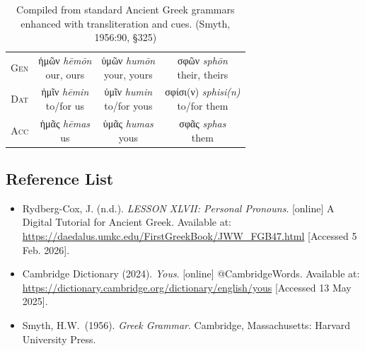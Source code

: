 \documentclass[10pt,a4paper,notitlepage]{article}
\newcommand{\tsc}[1]{\textsc{#1}}
\newcommand*{\grc}[1]{\fontspec{Inter}#1\rmfamily}
\newcommand{\trc}[1]{\textit{\fontspec{Tinos}#1}}
\begin{document}
\begin{table}[H]
\begin{tabular}{c|ccc}
             \tsc{Gen} & \makecell{\grc{ἡμῶν} \trc{hēmōn} \\ \small our, ours} & \makecell{\grc{ὑμῶν} \trc{humōn} \\ \small your, yours}  & \makecell{\grc{σφῶν} \trc{sphōn} \\ \small their, theirs} \\
             \tsc{Dat} & \makecell{\grc{ἡμῖν} \trc{hēmin} \\ \small to/for us} & \makecell{\grc{ὑμῖν} \trc{humin} \\ \small to/for yous}  & \makecell{\grc{σφίσι(ν)} \trc{sphisi(n)} \\ \small to/for them} \\
             \tsc{Acc} & \makecell{\grc{ἡμᾶς} \trc{hēmas} \\ \small us} & \makecell{\grc{ὑμᾶς} \trc{humas} \\ \small yous}  & \makecell{\grc{σφᾶς} \trc{sphas} \\ \small them} \\
         \end{tabular}
         \caption{Compiled from standard Ancient Greek grammars enhanced with transliteration and cues. (Smyth, 1956:90, \S325)}
     \end{table}

    \subsection*{Reference List}
    \begin{itemize}[label={}, leftmargin=0]
        \item Rydberg-Cox, J. (n.d.). \textit{LESSON XLVII: Personal Pronouns}. [online] A Digital Tutorial for Ancient Greek. Available at: \url{https://daedalus.umkc.edu/FirstGreekBook/JWW_FGB47.html} [Accessed 5 Feb. 2026].
        \item Cambridge Dictionary (2024). \textit{Yous}. [online] @CambridgeWords. Available at: \url{https://dictionary.cambridge.org/dictionary/english/yous} [Accessed 13 May 2025].
        \item Smyth, H.W.\ (1956). \textit{Greek Grammar}. Cambridge, Massachusetts: Harvard University Press.
    \end{itemize}
\end{document}
